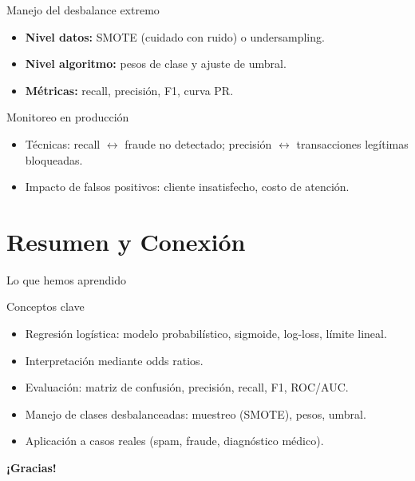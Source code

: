 \documentclass[aspectratio=169, 10pt, xcolor=table]{beamer}
\begin{document}
\begin{frame}{Manejo del desbalance extremo}
    \begin{itemize}
        \item \textbf{Nivel datos:} SMOTE (cuidado con ruido) o undersampling.
        \item \textbf{Nivel algoritmo:} pesos de clase y ajuste de umbral.
        \item \textbf{Métricas:} recall, precisión, F1, curva PR.
    \end{itemize}
    \vspace{0.3cm}
    \begin{block}{Monitoreo en producción}
        \begin{itemize}
            \item Técnicas: recall $\leftrightarrow$ fraude no detectado; precisión $\leftrightarrow$ transacciones legítimas bloqueadas.
            \item Impacto de falsos positivos: cliente insatisfecho, costo de atención.
        \end{itemize}
    \end{block}
\end{frame}

\section{Resumen y Conexión}

\begin{frame}{Lo que hemos aprendido}
    \begin{exampleblock}{Conceptos clave}
        \begin{itemize}
            \item Regresión logística: modelo probabilístico, sigmoide, log-loss, límite lineal.
            \item Interpretación mediante odds ratios.
            \item Evaluación: matriz de confusión, precisión, recall, F1, ROC/AUC.
            \item Manejo de clases desbalanceadas: muestreo (SMOTE), pesos, umbral.
            \item Aplicación a casos reales (spam, fraude, diagnóstico médico).
        \end{itemize}
    \end{exampleblock}

\end{frame}

\begin{frame}
    \centering
    \Huge \textbf{¡Gracias!}

\end{frame}
\end{document}
